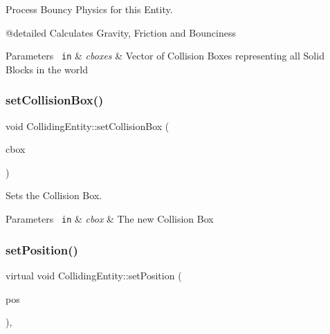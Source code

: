 Process Bouncy Physics for this Entity. 

@detailed Calculates Gravity, Friction and Bounciness


\begin{DoxyParams}[1]{Parameters}
\mbox{\texttt{ in}}  & {\em cboxes} & Vector of Collision Boxes representing all Solid Blocks in the world \\
\hline
\end{DoxyParams}
\mbox{\label{class_colliding_entity_a374b018899b679791c3154d29457a9c5}} 
\subsubsection{\texorpdfstring{setCollisionBox()}{setCollisionBox()}}
{\footnotesize\ttfamily void Colliding\+Entity\+::set\+Collision\+Box (\begin{DoxyParamCaption}\item[{\mbox{\hyperlink{class_collision_box}{Collision\+Box}}}]{cbox }\end{DoxyParamCaption})\hspace{0.3cm}{\ttfamily [inline]}}



Sets the Collision Box. 


\begin{DoxyParams}[1]{Parameters}
\mbox{\texttt{ in}}  & {\em cbox} & The new Collision Box \\
\hline
\end{DoxyParams}
\mbox{\label{class_colliding_entity_a9fe117b77d6df746538d25ca501ea47a}} 
\subsubsection{\texorpdfstring{setPosition()}{setPosition()}\hspace{0.1cm}{\footnotesize\ttfamily [1/2]}}
{\footnotesize\ttfamily virtual void Colliding\+Entity\+::set\+Position (\begin{DoxyParamCaption}\item[{\mbox{\hyperlink{classsf_1_1_vector2}{sf\+::\+Vector2f}}}]{pos }\end{DoxyParamCaption})\hspace{0.3cm}{\ttfamily [inline]}, {\ttfamily [virtual]}}



